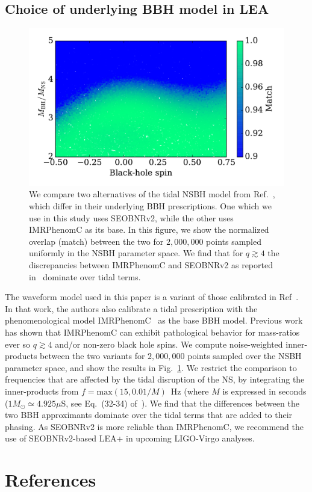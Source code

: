 \documentclass[aps,prd,amsmath,floats,floatfix, twocolumn,
superscriptaddress,nofootinbib,showpacs]{revtex4-1}
\begin{document}
\begin{appendix}
\section{Choice of underlying BBH model in LEA}
% 
\begin{figure}
\centering    
\includegraphics[width=1.05\columnwidth]{match-q-spin1-PhenomC-mf0_01.pdf}
\caption{%
We compare two alternatives of the tidal NSBH model from Ref.~\cite{
Lackey:2013axa}, which differ in their underlying BBH prescriptions. One which
we use in this study uses SEOBNRv2, while the other uses IMRPhenomC as its
base. In this figure, we show the normalized overlap (match) between the two for
$2,000,000$ points sampled uniformly in the NSBH parameter space. We find that
for $q\gtrsim 4$ the discrepancies between IMRPhenomC and SEOBNRv2 as reported
in~\cite{Kumar:2015tha} dominate over tidal terms.
\label{fig:PhenomC_vs_SEOBNRv2_LEA}
}
\end{figure}
%
The waveform model used in this paper is a variant of those calibrated
in Ref~\cite{Lackey:2013axa}. In that work, the authors also calibrate
a tidal prescription with the phenomenological model IMRPhenomC~\cite{
Santamaria:2010yb}
as the base BBH model. Previous work~\cite{Kumar:2015tha} has shown that 
IMRPhenomC can exhibit pathological behavior for mass-ratios ever so
$q\gtrsim 4$ and/or non-zero black hole spins. We compute noise-weighted
inner-products between the two variants for $2,000,000$ points sampled
over the NSBH parameter space, and show the results in Fig.~\ref{fig:PhenomC_vs_SEOBNRv2_LEA}. We restrict the comparison to frequencies
that are affected by the tidal disruption of the NS, by integrating
the inner-products from $f = \mathrm{max}(15, 0.01/M)$~Hz
(where $M$ is expressed in seconds ($1M_\odot \simeq 4.925\mu$S, see
Eq.~(32-34) of~\cite{Lackey:2013axa}).
% 
We find that the differences between the two BBH approximants dominate
over the tidal terms that are added to their phasing. As SEOBNRv2 is
more reliable than IMRPhenomC, we recommend the use of SEOBNRv2-based
LEA+ in upcoming LIGO-Virgo analyses.


\end{appendix}




\section*{References}

\end{document}
